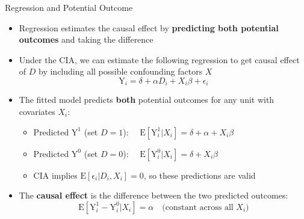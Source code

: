 \documentclass[dvipsnames,hyperref={pdfpagelabels=false}]{beamer}
\begin{document}
\begin{frame}{Regression and Potential Outcome}
	\begin{itemize}
		\item Regression estimates the causal effect by \textbf{predicting both potential outcomes} and taking the difference
		\vspace{0.2cm}
		\item Under the CIA, we can estimate the following regression to get causal effect of $D$ by including all possible confounding factors $X$
		\begin{equation*}
			\mathrm{Y}_i = \delta + \alpha D_i + X_{i}\beta + \epsilon_{i}
		\end{equation*}
		\item The fitted model predicts \textbf{both} potential outcomes for any unit with covariates $X_i$:
		\vspace{0.1cm}
		\begin{itemize}
			\item Predicted $\mathrm{Y}^{1}$ (set $D=1$): $\quad\mathrm{E}[\mathrm{Y}^{1}_{i}|X_{i}] = \delta + \alpha + X_{i}\beta$
			\vspace{0.15cm}
			\item Predicted $\mathrm{Y}^{0}$ (set $D=0$): $\quad\mathrm{E}[\mathrm{Y}^{0}_{i}|X_{i}] = \delta + X_{i}\beta$
			\vspace{0.15cm}
			\item CIA implies $\mathrm{E}[\epsilon_{i}|D_i,X_{i}] = 0$, so these predictions are valid
		\end{itemize}
		\vspace{0.2cm}
		\item The \textbf{causal effect} is the difference between the two predicted outcomes:
		\begin{equation*}
			\mathrm{E}[\mathrm{Y}^{1}_{i} - \mathrm{Y}^{0}_{i}|X_{i}] = \alpha \quad \text{(constant across all } X_i\text{)}
		\end{equation*}
	\end{itemize}
\end{frame}
\end{document}
